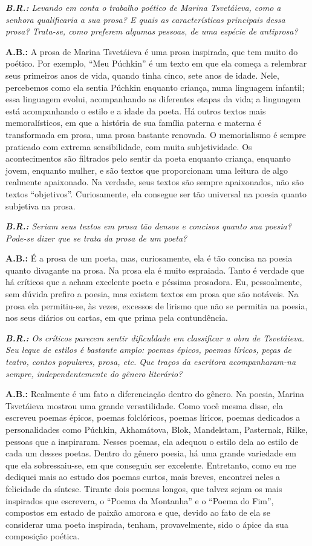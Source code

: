 \emph{\textbf{B.R.:} Levando em conta o trabalho poético de Marina
Tsvetáieva, como a senhora qualificaria a sua prosa? E quais as
características principais dessa prosa? Trata-se, como preferem algumas
pessoas, de uma espécie de antiprosa?}

\textbf{A.B.:} A prosa de Marina Tsvetáieva é uma prosa inspirada, que
tem muito do poético. Por exemplo, ``Meu Púchkin'' é um texto em que ela
começa a relembrar seus primeiros anos de vida, quando tinha cinco, sete
anos de idade. Nele, percebemos como ela sentia Púchkin enquanto
criança, numa linguagem infantil; essa linguagem evolui, acompanhando as
diferentes etapas da vida; a linguagem está acompanhando o estilo e a
idade da poeta. Há outros textos mais memoralísticos, em que a história
de sua família paterna e materna é transformada em prosa, uma prosa
bastante renovada. O memorialismo é sempre praticado com extrema
sensibilidade, com muita subjetividade. Os acontecimentos são filtrados
pelo sentir da poeta enquanto criança, enquanto jovem, enquanto mulher,
e são textos que proporcionam uma leitura de algo realmente apaixonado.
Na verdade, seus textos são sempre apaixonados, não são textos
``objetivos''. Curiosamente, ela consegue ser tão universal na poesia
quanto subjetiva na prosa.

\emph{\textbf{B.R.:} Seriam seus textos em prosa tão densos e concisos
quanto sua poesia? Pode-se dizer que se trata da prosa de um poeta?}

\textbf{A.B.:} É a prosa de um poeta, mas, curiosamente, ela é tão
concisa na poesia quanto divagante na prosa. Na prosa ela é muito
espraiada. Tanto é verdade que há críticos que a acham excelente poeta e
péssima prosadora. Eu, pessoalmente, sem dúvida prefiro a poesia, mas
existem textos em prosa que são notáveis. Na prosa ela permitiu-se, às
vezes, excessos de lirismo que não se permitia na poesia, nos seus
diários ou cartas, em que prima pela contundência.

\emph{\textbf{B.R.:} Os críticos parecem sentir dificuldade em
classificar a obra de Tsvetáieva. Seu leque de estilos é bastante amplo:
poemas épicos, poemas líricos, peças de teatro, contos populares, prosa,
etc. Que traços da escritora acompanharam-na sempre, independentemente
do gênero literário?}

\textbf{A.B.:} Realmente é um fato a diferenciação dentro do gênero. Na
poesia, Marina Tsvetáieva mostrou uma grande versatilidade. Como você
mesma disse, ela escreveu poemas épicos, poemas folclóricos, poemas
líricos, poemas dedicados a personalidades como Púchkin, Akhamátova,
Blok, Mandelstam, Pasternak, Rilke, pessoas que a inspiraram. Nesses
poemas, ela adequou o estilo dela ao estilo de cada um desses poetas.
Dentro do gênero poesia, há uma grande variedade em que ela
sobressaiu-se, em que conseguiu ser excelente. Entretanto, como eu me
dediquei mais ao estudo dos poemas curtos, mais breves, encontrei neles
a felicidade da síntese. Tirante dois poemas longos, que talvez sejam os
mais inspirados que escrevera, o ``Poema da Montanha'' e o ``Poema do
Fim'', compostos em estado de paixão amorosa e que, devido ao fato de
ela se considerar uma poeta inspirada, tenham, provavelmente, sido o
ápice da sua composição poética.

